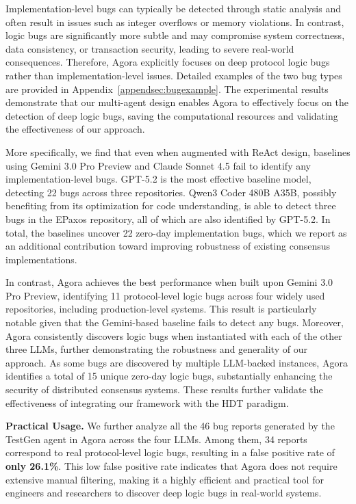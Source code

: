 \documentclass{article}
\theoremstyle{plain}
\theoremstyle{definition}
\theoremstyle{remark}
\newcommand{\consensustester}{Agora\xspace}
\newcommand{\agentc}{TestGen\xspace}
\begin{document}
Implementation-level bugs can typically be detected through static analysis and often result in issues such as integer overflows or memory violations. In contrast, logic bugs are significantly more subtle and may compromise system correctness, data consistency, or transaction security, leading to severe real-world consequences. Therefore, \consensustester explicitly focuses on deep protocol logic bugs rather than implementation-level issues. Detailed examples of the two bug types are provided in Appendix~\ref{appendsec:bugexample}. The experimental results demonstrate that our multi-agent design enables \consensustester to effectively focus on the detection of deep logic bugs, saving the computational resources and validating the effectiveness of our approach.



More specifically, we find that even when augmented with ReAct design, baselines using Gemini 3.0 Pro Preview and Claude Sonnet 4.5 fail to identify any implementation-level bugs. GPT-5.2 is the most effective baseline model, detecting 22 bugs across three repositories. Qwen3 Coder 480B A35B, possibly benefiting from its optimization for code understanding, is able to detect three bugs in the EPaxos repository, all of which are also identified by GPT-5.2. In total, the baselines uncover 22 zero-day implementation bugs, which we report as an additional contribution toward improving robustness of existing consensus implementations.

In contrast, \consensustester achieves the best performance when built upon Gemini 3.0 Pro Preview, identifying 11 protocol-level logic bugs across four widely used repositories, including production-level systems. This result is particularly notable given that the Gemini-based baseline fails to detect any bugs. Moreover, \consensustester consistently discovers logic bugs when instantiated with each of the other three LLMs, further demonstrating the robustness and generality of our approach. As some bugs are discovered by multiple LLM-backed instances, \consensustester identifies a total of 15 unique zero-day logic bugs, substantially enhancing the security of distributed consensus systems. These results further validate the effectiveness of integrating our framework with the HDT paradigm.

\textbf{Practical Usage.} We further analyze all the 46 bug reports generated by the \agentc agent in \consensustester across the four LLMs. Among them, 34 reports correspond to real protocol-level logic bugs, resulting in a false positive rate of \textbf{only 26.1\%}. This low false positive rate indicates that \consensustester does not require extensive manual filtering, making it a highly efficient and practical tool for engineers and researchers to discover deep logic bugs in real-world systems.
\end{document}
